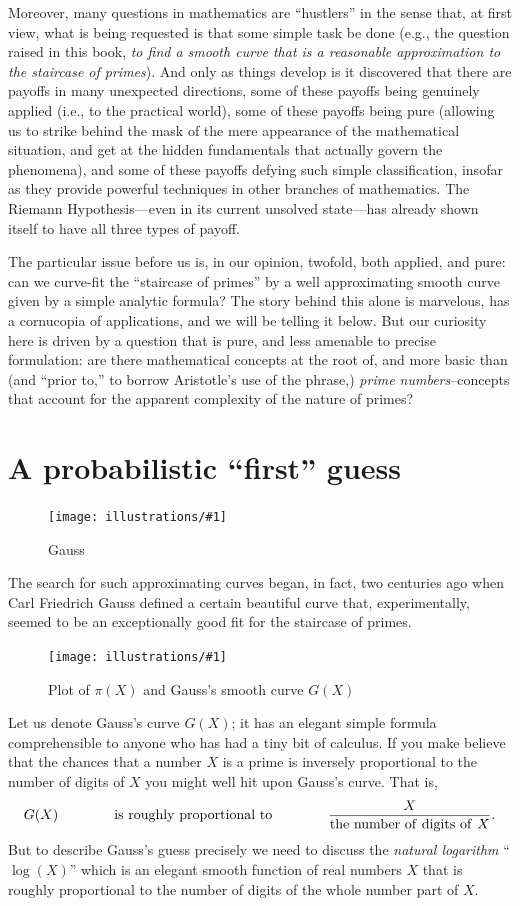 \documentclass[openany]{book}
\newcommand{\ill}[3]{%
   \begin{figure}[H]%
   \vspace{-2ex}
   \centering%
   \texttt{[image: illustrations/\#1]}%
   \caption{#3}%
   \vspace{-2ex}
    \end{figure}}
\theoremstyle{plain}
\theoremstyle{definition}
\newcommand{\RH}{Riemann Hypothesis\index{Riemann Hypothesis}}
\begin{document}
 Moreover, many questions in
mathematics are ``hustlers'' in the sense that, at first view, what is
being requested is that some simple task be done (e.g., the question
raised in this book, {\em to find a smooth curve that is a reasonable
  approximation to the staircase of primes}).  And only as things
develop is it discovered that there are payoffs in many unexpected
directions, some of these payoffs being genuinely applied (i.e., to
the practical world), some of these payoffs being pure (allowing us
to strike behind the mask of the mere appearance of the mathematical
situation, and get at the hidden fundamentals that actually govern the
phenomena), and some of these payoffs defying such simple
classification, insofar as they provide powerful techniques in other
branches of mathematics.  The \RH{}---even in its current
unsolved state---has already shown itself to have all three types of
payoff.

The particular issue before us is, in our opinion, twofold, both
applied, and pure: can we curve-fit the ``staircase of primes'' by a
well approximating smooth curve given by a simple analytic formula?
The story behind this alone is
marvelous, has a cornucopia of applications, and we will be telling it
below. But our curiosity here is driven by a question that is pure,
and less amenable to precise formulation: are there mathematical
concepts at the root of, and more basic than (and ``prior to,'' to
borrow Aristotle's use of the phrase,) {\em prime numbers}--concepts
that account for the apparent complexity of the nature of primes?


\chapter{A probabilistic ``first'' guess\label{sec:firstguess} }

\ill{gauss}{.3}{Gauss}

The search for such approximating curves began, in fact, two centuries
ago when Carl Friedrich Gauss defined a certain beautiful curve that,
experimentally, seemed to be an exceptionally good fit for the
staircase of primes.

\ill{pi_Li}{.7}{Plot of $\pi(X)$ and Gauss's smooth curve $G(X)$}

Let us denote Gauss's curve $G(X)$; it has an
elegant simple formula comprehensible to anyone who has had a tiny bit
of calculus.  If you make believe that the chances that a number $X$ is
a prime is inversely proportional to the number of digits of $X$ you
might well hit upon Gauss's curve.
That is,
\vskip10pt
$$G(X)\hskip40pt  {\rm is\ roughly\ proportional\ to} \hskip40pt  {\frac{X}{{\rm the\ number\ of\ digits\ of\ } X}}.$$
\vskip10pt
But to describe Gauss's guess precisely we need to discuss the {\it natural logarithm} ``$\log(X)$'' which is an elegant smooth function of real numbers $X$ that is roughly proportional to the number of digits of the whole number part of $X$.
\end{document}
